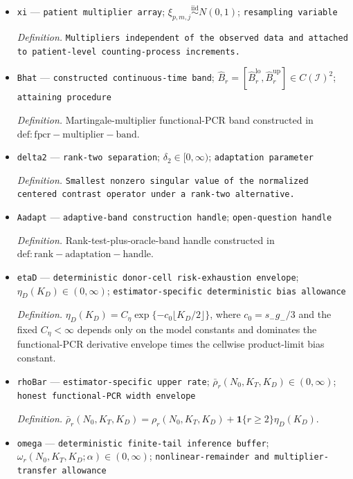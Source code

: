 \documentclass{article}
\begin{document}
\begin{itemize}
  \item \texttt{xi} --- \texttt{patient multiplier array}; \(\xi_{p,m,j}\stackrel{\mathrm{iid}}{\sim}N(0,1)\); \texttt{resampling variable}
  \par\smallskip\noindent\emph{Definition.} \texttt{Multipliers independent of the observed data and attached to patient-\allowbreak{}level counting-\allowbreak{}process increments.}
  \item \texttt{Bhat} --- \texttt{constructed continuous-\allowbreak{}time band}; \(\widehat B_r=[\widehat B_r^{\mathrm{lo}},\widehat B_r^{\mathrm{up}}]\in C(\mathcal I)^2\); \texttt{attaining procedure}
  \par\smallskip\noindent\emph{Definition.} Martingale-multiplier functional-PCR band constructed in \(\mathrm{def:fpcr-multiplier-band}\).
  \item \texttt{delta2} --- \texttt{rank-\allowbreak{}two separation}; \(\delta_2\in[0,\infty)\); \texttt{adaptation parameter}
  \par\smallskip\noindent\emph{Definition.} \texttt{Smallest nonzero singular value of the normalized centered contrast operator under a rank-\allowbreak{}two alternative.}
  \item \texttt{Aadapt} --- \texttt{adaptive-\allowbreak{}band construction handle}; \texttt{open-\allowbreak{}question handle}
  \par\smallskip\noindent\emph{Definition.} Rank-test-plus-oracle-band handle constructed in \(\mathrm{def:rank-adaptation-handle}\).
  \item \texttt{etaD} --- \texttt{deterministic donor-\allowbreak{}cell risk-\allowbreak{}exhaustion envelope}; \(\eta_D(K_D)\in(0,\infty)\); \texttt{estimator-\allowbreak{}specific deterministic bias allowance}
  \par\smallskip\noindent\emph{Definition.} \(\eta_D(K_D)=C_\eta\exp\{-c_0\lfloor K_D/2\rfloor\}\), where \(c_0=s_-g_-/3\) and the fixed \(C_\eta<\infty\) depends only on the model constants and dominates the functional-PCR derivative envelope times the cellwise product-limit bias constant.
  \item \texttt{rhoBar} --- \texttt{estimator-\allowbreak{}specific upper rate}; \(\bar\rho_r(N_0,K_T,K_D)\in(0,\infty)\); \texttt{honest functional-\allowbreak{}PCR width envelope}
  \par\smallskip\noindent\emph{Definition.} \(\bar\rho_r(N_0,K_T,K_D)=\rho_r(N_0,K_T,K_D)+\mathbf 1\{r\ge2\}\eta_D(K_D)\).
  \item \texttt{omega} --- \texttt{deterministic finite-\allowbreak{}tail inference buffer}; \(\omega_r(N_0,K_T,K_D;\alpha)\in(0,\infty)\); \texttt{nonlinear-\allowbreak{}remainder and multiplier-\allowbreak{}transfer allowance}

\end{itemize}
\end{document}
